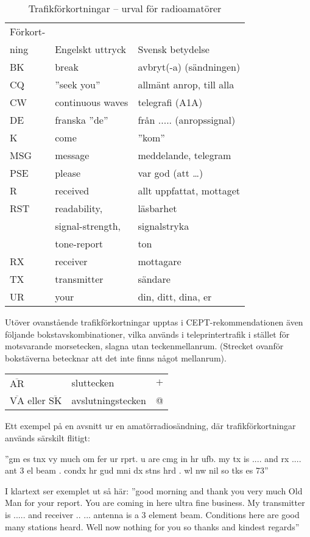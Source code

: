 \begin{table}
  \caption{Trafikförkortningar -- urval för radioamatörer}
  \label{tab:trafikforkortningar}
  \begin{tabular}{lll}
    Förkort- & & \\
    ning & Engelskt uttryck & Svensk betydelse \\
    \hline
    BK & break & avbryt(-a) (sändningen) \\
    CQ & ''seek you'' & allmänt anrop, till alla \\
    CW & continuous waves & telegrafi (A1A) \\
    DE & franska ''de'' & från ..... (anropssignal) \\
    K  & come & ''kom'' \\
    MSG & message & meddelande, telegram \\
    PSE & please & var god (att \dots) \\
    R & received & allt uppfattat, mottaget \\
   RST & readability, & läsbarhet \\
   & signal-strength, & signalstryka \\
   & tone-report & ton \\
    RX & receiver & mottagare \\
    TX & transmitter & sändare \\
    UR & your & din, ditt, dina, er \\
  \end{tabular}
\end{table}

Utöver ovanstående trafikförkortningar upptas i CEPT-rekommendationen
även följande bokstavskombinationer, vilka används i teleprintertrafik
i stället för motsvarande morsetecken, slagna utan teckenmellanrum.
(Strecket ovanför bokstäverna betecknar att det inte finns något mellanrum).

\begin{tabular}{lll}
  \(\overline{\mathrm{AR}}\) & sluttecken & \(+\) \\
  \(\overline{\mathrm{VA}}\) eller \(\overline{\mathrm{SK}}\) & avslutningstecken & @ \\
\end{tabular}

Ett exempel på en avsnitt ur en amatörradiosändning, där
trafikförkortningar används särskilt flitigt:

''gm es tnx vy much om fer ur rprt. u are cmg in hr ufb. my tx is
.... and rx .... ant 3 el beam . condx hr gud mni dx stns hrd . wl nw
nil so tks es 73''

I klartext ser exemplet ut så här: ''good morning and thank you very
much Old Man for your report.
You are coming in here ultra fine business.
My transmitter is .....  and receiver .. ... antenna is a 3 element beam.
Conditions here are good many stations heard.
Well now nothing for you so thanks and kindest regards''
